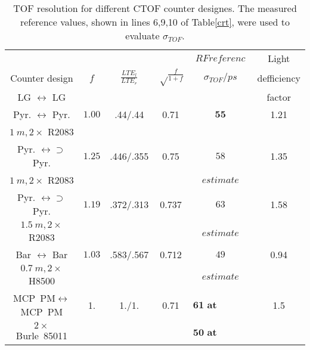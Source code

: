 \begin{table}[ht]
\begin{center}
\begin{tabular}{|c|c|c|c|c|c|}                                                                         \hline
                                   &      &     &     &    $RF referenc$ &   Light       \\ 
 Counter design    &$f$   & $\frac{LTE_{l}}{LTE_{r}}$ & $\sqrt\frac{f}{1+f}$ & $\sigma_{TOF}/ps$& defficiency  \\ 
  LG $\leftrightarrow$ LG           &      &     &     &                     &   factor  \\ \hline
 Pyr. $\leftrightarrow$ Pyr.        &$1.00$& .44/.44   & 0.71 & $\textbf{55}$&  1.21   \\
  $1~m, 2\times$ R2083                               &      &     &     &   &           \\ \hline

 Pyr. $\leftrightarrow \supset$ Pyr.&$1.25$& .446/.355   & 0.75 & $58$&  1.35         \\
   $1~m, 2\times$ R2083                               &      &     &     &  $estimate$  &           \\ \hline

 Pyr. $\leftrightarrow \supset$ Pyr.&$1.19$& .372/.313   & 0.737 & $63$&  1.58         \\
   $1.5~m, 2\times$ R2083                               &      &     &     &    $estimate$    &           \\ \hline

 Bar $\leftrightarrow $ Bar         &$1.03$& .583/.567 & 0.712& $49$      & 0.94         \\
    $0.7~m, 2\times$ H8500                            &      &     &     &   $estimate$   &           \\ \hline

 MCP~PM$\leftrightarrow $MCP~PM          & 1. & 1./1. & 0.71& $\textbf{61 at 1.0~MHz}$       & 1.5         \\
    $2\times$ Burle~85011                            &      &     &     &   $\textbf{50 at 0.1~MHz}$   &           \\ \hline
\end{tabular}    
\caption{TOF resolution  for different CTOF counter designes. 
The measured  reference values, shown in lines 6,9,10 of Table\ref{crt},  were used to evaluate $\sigma_{TOF}$.
\label{table4}}
\end{center}
\end{table}



